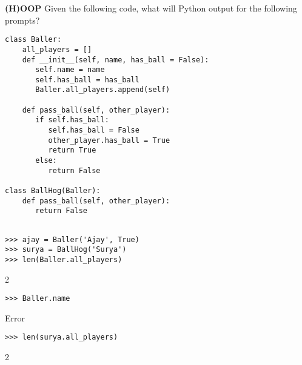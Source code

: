 \begin{blocksection}
\question \textbf{(H)OOP} \newline
Given the following code, what will Python output for the following prompts? 

\begin{lstlisting}
class Baller:
    all_players = []
    def __init__(self, name, has_ball = False):
       self.name = name
       self.has_ball = has_ball
       Baller.all_players.append(self)
    
    def pass_ball(self, other_player):
       if self.has_ball:
          self.has_ball = False
          other_player.has_ball = True
          return True
       else:
          return False

class BallHog(Baller):
    def pass_ball(self, other_player):  
       return False 
       
\end{lstlisting}
\end{blocksection}

\begin{blocksection}

\begin{lstlisting}
>>> ajay = Baller('Ajay', True)
>>> surya = BallHog('Surya')
>>> len(Baller.all_players)
\end{lstlisting}
\begin{solution}[.2in]
2
\end{solution}

\begin{lstlisting}
>>> Baller.name
\end{lstlisting}
\begin{solution}[.2in]
Error
\end{solution}

\begin{lstlisting}
>>> len(surya.all_players)
\end{lstlisting}
\begin{solution}[.2in]
2
\end{solution}
\end{blocksection}

